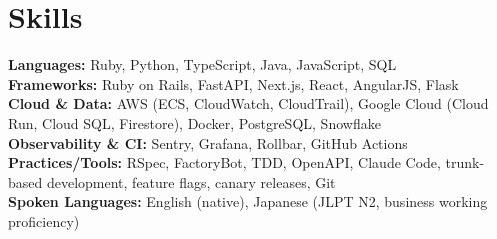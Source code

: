 \documentclass[10pt,letterpaper]{article}
\begin{document}
\section*{Skills}
\textbf{Languages:} Ruby, Python, TypeScript, Java, JavaScript, SQL \\
\textbf{Frameworks:} Ruby on Rails, FastAPI, Next.js, React, AngularJS, Flask \\
\textbf{Cloud \& Data:} AWS (ECS, CloudWatch, CloudTrail), Google Cloud (Cloud Run, Cloud SQL,
Firestore), Docker, PostgreSQL, Snowflake \\
\textbf{Observability \& CI:} Sentry, Grafana, Rollbar, GitHub Actions \\
\textbf{Practices/Tools:} RSpec, FactoryBot, TDD, OpenAPI, Claude Code, trunk-based development,
feature flags, canary releases, Git \\
\textbf{Spoken Languages:} English (native), Japanese (JLPT N2, business working proficiency)
\end{document}
